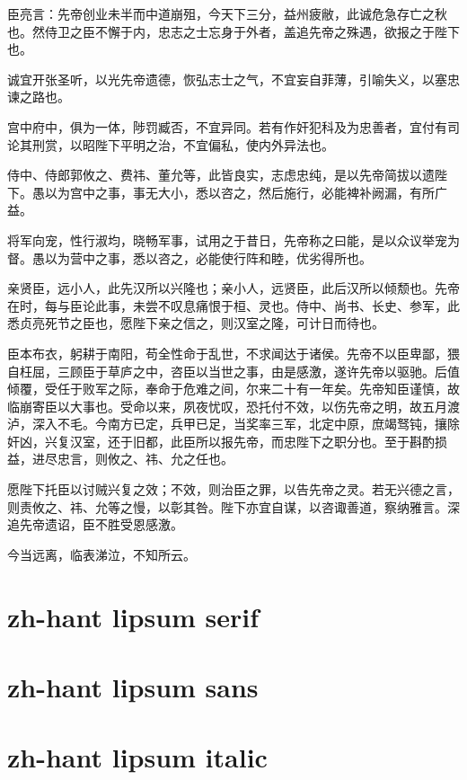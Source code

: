 \documentclass[a4paper,12pt, fontset=none, hyperref]{ctexbook}
\begin{document}
		臣亮言：先帝创业未半而中道崩殂，今天下三分，益州疲敝，此诚危急存亡之秋也。然侍卫之臣不懈于内，忠志之士忘身于外者，盖追先帝之殊遇，欲报之于陛下也。
		
		诚宜开张圣听，以光先帝遗德，恢弘志士之气，不宜妄自菲薄，引喻失义，以塞忠谏之路也。
		
		宫中府中，俱为一体，陟罚臧否，不宜异同。若有作奸犯科及为忠善者，宜付有司论其刑赏，以昭陛下平明之治，不宜偏私，使内外异法也。
		
		侍中、侍郎郭攸之、费祎、董允等，此皆良实，志虑忠纯，是以先帝简拔以遗陛下。愚以为宫中之事，事无大小，悉以咨之，然后施行，必能裨补阙漏，有所广益。
		
		将军向宠，性行淑均，晓畅军事，试用之于昔日，先帝称之曰能，是以众议举宠为督。愚以为营中之事，悉以咨之，必能使行阵和睦，优劣得所也。
		
		亲贤臣，远小人，此先汉所以兴隆也；亲小人，远贤臣，此后汉所以倾颓也。先帝在时，每与臣论此事，未尝不叹息痛恨于桓、灵也。侍中、尚书、长史、参军，此悉贞亮死节之臣也，愿陛下亲之信之，则汉室之隆，可计日而待也。
		
		臣本布衣，躬耕于南阳，苟全性命于乱世，不求闻达于诸侯。先帝不以臣卑鄙，猥自枉屈，三顾臣于草庐之中，咨臣以当世之事，由是感激，遂许先帝以驱驰。后值倾覆，受任于败军之际，奉命于危难之间，尔来二十有一年矣。先帝知臣谨慎，故临崩寄臣以大事也。受命以来，夙夜忧叹，恐托付不效，以伤先帝之明，故五月渡泸，深入不毛。今南方已定，兵甲已足，当奖率三军，北定中原，庶竭驽钝，攘除奸凶，兴复汉室，还于旧都，此臣所以报先帝，而忠陛下之职分也。至于斟酌损益，进尽忠言，则攸之、祎、允之任也。
		
		愿陛下托臣以讨贼兴复之效；不效，则治臣之罪，以告先帝之灵。若无兴德之言，则责攸之、祎、允等之慢，以彰其咎。陛下亦宜自谋，以咨诹善道，察纳雅言。深追先帝遗诏，臣不胜受恩感激。
		
		今当远离，临表涕泣，不知所云。

	\chapter{zh-hant lipsum serif}

		\zhlipsum[1-20][name=trad]

	\chapter{zh-hant lipsum sans}

		\textsf{\zhlipsum[1-20][name=xiangyu]}
	
	\chapter{zh-hant lipsum italic}
	
\end{document}
